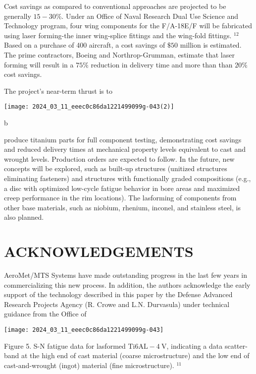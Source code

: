 \documentclass[10pt]{article}
\begin{document}
Cost savings as compared to conventional approaches are projected to be generally $15-30 \%$. Under an Office of Naval Research Dual Use Science and Technology program, four wing components for the F/A-18E/F will be fabricated using laser forming-the inner wing-splice fittings and the wing-fold fittings. ${ }^{12}$ Based on a purchase of 400 aircraft, a cost savings of $\$ 50$ million is estimated. The prime contractors, Boeing and Northrop-Grumman, estimate that laser forming will result in a $75 \%$ reduction in delivery time and more than than $20 \%$ cost savings.

The project's near-term thrust is to

\begin{center}
\texttt{[image: 2024\_03\_11\_eeec0c86da1221499099g-043(2)]}
\end{center}

b

produce titanium parts for full component testing, demonstrating cost savings and reduced delivery times at mechanical property levels equivalent to cast and wrought levels. Production orders are expected to follow. In the future, new concepts will be explored, such as built-up structures (unitized structures eliminating fasteners) and structures with functionally graded compositions (e.g., a disc with optimized low-cycle fatigue behavior in bore areas and maximized creep performance in the rim locations). The lasforming of components from other base materials, such as niobium, rhenium, inconel, and stainless steel, is also planned.

\section*{ACKNOWLEDGEMENTS}
AeroMet/MTS Systems have made outstanding progress in the last few years in commercializing this new process. In addition, the authors acknowledge the early support of the technology described in this paper by the Defense Advanced Research Projects Agency (R. Crowe and L.N. Durvasula) under technical guidance from the Office of

\begin{center}
\texttt{[image: 2024\_03\_11\_eeec0c86da1221499099g-043]}
\end{center}

Figure 5. S-N fatigue data for lasformed Ti$6 \mathrm{AL}-4 \mathrm{~V}$, indicating a data scatter-band at the high end of cast material (coarse microstructure) and the low end of cast-and-wrought (ingot) material (fine microstructure). ${ }^{11}$
\end{document}
